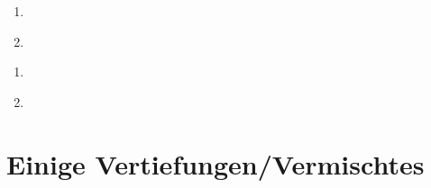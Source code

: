 \documentclass[12pt]{scrreprt}
\begin{document}
\begin{bsp}
  \label{bsp:reihen.maj-krit}

\end{bsp}

\begin{satz}[Quotientenkriterium]
  \label{satz:reihen.quot-krit}

  \begin{enumerate}
    \item \label{satz:reihen.quot-krit.a}
    \item \label{satz:reihen.quot-krit.b}
  \end{enumerate}
\end{satz}

\begin{bsp}
  \label{bsp:reihen.quot-krit}

\end{bsp}

\begin{satz}[Wurzelkriterium]
  \label{satz:reihen.wurzel-krit}

  \begin{enumerate}
    \item \label{satz:reihen.wurzel-krit.a}
    \item \label{satz:reihen.wurzel-krit.b}
  \end{enumerate}
\end{satz}

\begin{bsp}
  \label{bsp:reihen.wurzel-krit}

\end{bsp}

\section{Einige Vertiefungen/Vermischtes}
\label{sec:reihen.vermischtes}

\begin{bsp}[Dezimaldarstellung]
  \label{bsp:reihen.dez}

\end{bsp}

\begin{dfn}
  \label{dfn:reihen.abzaehlbar}

\end{dfn}

\begin{bsp}
  \label{bsp:reihen.abzaehlbar}

\end{bsp}
\end{document}
